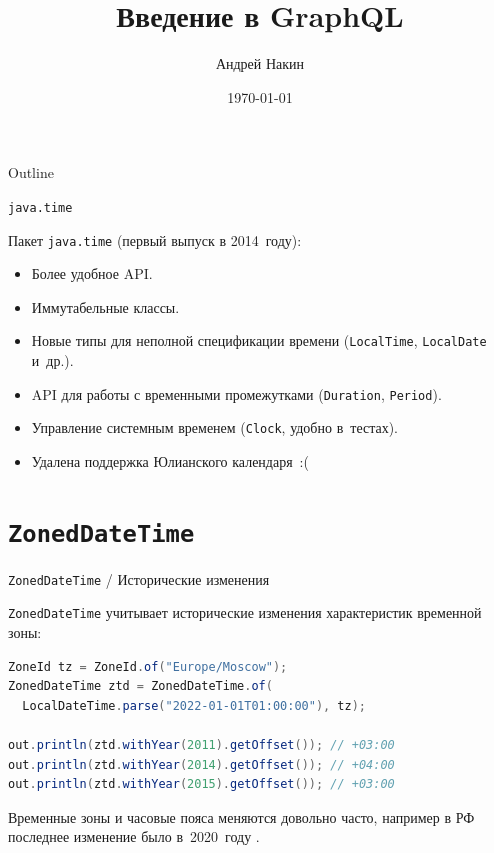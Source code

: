 \documentclass{beamer}
\title{Введение в GraphQL}
\author{Андрей Накин}
\date{\today}
\begin{document}
\begin{frame}
    \titlepage 
\end{frame}



\begin{frame}{Outline}
    \tableofcontents
\end{frame}

\begin{frame}{{\tt java.time}}

Пакет {\tt java.time} (первый выпуск в 2014~году):

\begin{itemize}
    \item Более удобное API.
    \item Иммутабельные классы.
    \item Новые типы для неполной спецификации времени ({\tt LocalTime}, {\tt LocalDate} и~др.).
    \item API для работы с временными промежутками ({\tt Duration}, {\tt Period}).
    \item Управление системным временем ({\tt Clock}, удобно в~тестах).
    \item Удалена поддержка Юлианского календаря~:(
\end{itemize}

\end{frame}

\section{{\tt ZonedDateTime}}

\begin{frame}[fragile]{{\tt ZonedDateTime} / Исторические изменения}

{\tt ZonedDateTime} учитывает исторические изменения характеристик временной зоны:
\bigskip

\begin{lstlisting}[language=java]
ZoneId tz = ZoneId.of("Europe/Moscow");
ZonedDateTime ztd = ZonedDateTime.of(
  LocalDateTime.parse("2022-01-01T01:00:00"), tz);

out.println(ztd.withYear(2011).getOffset()); // +03:00
out.println(ztd.withYear(2014).getOffset()); // +04:00
out.println(ztd.withYear(2015).getOffset()); // +03:00
\end{lstlisting}

Временные зоны и часовые пояса меняются довольно часто, например в РФ последнее изменение было в~2020~году \cite{dst_news}.

\end{frame}
\end{document}
